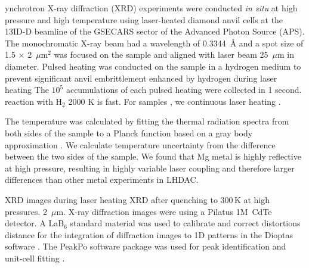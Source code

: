 \documentclass[draft,jgrga,12pt]{agujournal2019}
\begin{document}
ynchrotron X-ray diffraction (XRD) experiments were conducted \textit{in situ} at high pressure and high temperature using laser-heated diamond anvil cells at the 13ID-D beamline of the GSECARS sector of the Advanced Photon Source (APS). 
The monochromatic X-ray beam  had a wavelength of 0.3344~{\AA} and a spot size of 1.5 $\times$ 2~$\mu$m$^2$ 
 was focused on the sample and  aligned with  laser  beam  25~$\mu$m in diameter.  
Pulsed heating was conducted on the sample in a  hydrogen medium to prevent significant anvil embrittlement enhanced by hydrogen during laser heating \cite{prakapenka_advanced_2008,silvera_metallic_2018} %
The $10^5$ accumulations of each pulsed heating were collected in 1 second. 
 reaction with H$_2$  2000 {K} is fast. 
For  samples , we  continuous laser heating . 

The temperature was calculated by fitting the  thermal radiation spectra from both sides of the sample to a Planck function based on a gray body approximation \cite{prakapenka_advanced_2008}. 
We calculate temperature uncertainty from the difference between the two sides of the sample. 
We found that Mg metal is highly reflective at high pressure, resulting in highly variable laser coupling and therefore larger differences than other metal experiments in LHDAC\@.

 XRD images  during laser heating 
 XRD  after quenching to 300\,K at high pressures. %
 2~$\mu\mathrm{m}$.
X-ray diffraction images were  using a Pilatus 1M~CdTe detector. 
A LaB$_6$ standard material was used to calibrate and correct distortions   distance for the integration of diffraction images to 1D patterns in the Dioptas software \cite{prescher_dioptas_2015}. 
The PeakPo software package was used for peak identification and unit-cell fitting \cite{shim_shdshim_2018}.
\end{document}
